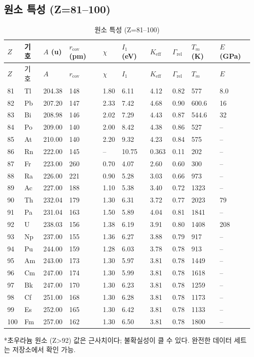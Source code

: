 \documentclass[12pt,a4paper]{article}
\newcommand{\Keff}{K_{\mathrm{eff}}}
\begin{document}
	\subsection*{원소 특성 (Z=81–100)}
	
	\begin{longtable}{p{0.6cm}p{1.2cm}p{1.2cm}p{1.2cm}p{1.2cm}p{1.2cm}p{1.5cm}p{1.2cm}p{1.2cm}p{1.2cm}}
		\caption{원소 특성 (Z=81–100)} \label{tab:elem-data-81to100} \\
		\toprule
		\(Z\) & 기호 & \(A\) (u) & \(r_{\text{cov}}\) (pm) & \(\chi\) & \(I_1\) (eV) & \(\Keff\) & \(\Gamma_{\text{rel}}\) & \(T_m\) (K) & \(E\) (GPa) \\
		\midrule
		\endfirsthead
		\toprule
		\(Z\) & 기호 & \(A\) & \(r_{\text{cov}}\) & \(\chi\) & \(I_1\) & \(\Keff\) & \(\Gamma_{\text{rel}}\) & \(T_m\) & \(E\) \\
		\midrule
		\endhead
		81 & Tl & 204.38 & 148 & 1.80 & 6.11 & 4.12 & 0.82 & 577 & 8.0 \\
		82 & Pb & 207.20 & 147 & 2.33 & 7.42 & 4.68 & 0.90 & 600.6 & 16 \\
		83 & Bi & 208.98 & 146 & 2.02 & 7.29 & 4.43 & 0.87 & 544.6 & 32 \\
		84 & Po & 209.00 & 140 & 2.00 & 8.42 & 4.38 & 0.86 & 527 & – \\
		85 & At & 210.00 & 140 & 2.20 & 9.32 & 4.23 & 0.84 & 575 & – \\
		86 & Rn & 222.00 & 145 & –    & 10.75 & 0.363 & 0.11 & 202 & – \\
		87 & Fr & 223.00 & 260 & 0.70 & 4.07 & 2.60 & 0.60 & 300 & – \\
		88 & Ra & 226.00 & 221 & 0.90 & 5.28 & 3.03 & 0.66 & 973 & – \\
		89 & Ac & 227.00 & 188 & 1.10 & 5.38 & 3.40 & 0.72 & 1323 & – \\
		90 & Th & 232.04 & 179 & 1.30 & 6.31 & 3.72 & 0.77 & 2023 & 79 \\
		91 & Pa & 231.04 & 163 & 1.50 & 5.89 & 4.04 & 0.81 & 1841 & – \\
		92 & U  & 238.03 & 156 & 1.38 & 6.19 & 3.91 & 0.80 & 1408 & 208 \\
		93 & Np & 237.00 & 155 & 1.36 & 6.27 & 3.88 & 0.79 & 917 & – \\
		94 & Pu & 244.00 & 159 & 1.28 & 6.03 & 3.78 & 0.78 & 913 & – \\
		95 & Am & 243.00 & 173 & 1.30 & 5.97 & 3.81 & 0.78 & 1449 & – \\
		96 & Cm & 247.00 & 174 & 1.30 & 5.99 & 3.81 & 0.78 & 1618 & – \\
		97 & Bk & 247.00 & 170 & 1.30 & 6.23 & 3.81 & 0.78 & 1259 & – \\
		98 & Cf & 251.00 & 168 & 1.30 & 6.28 & 3.81 & 0.78 & 1173 & – \\
		99 & Es & 252.00 & 165 & 1.30 & 6.42 & 3.81 & 0.78 & 1133 & – \\
		100& Fm & 257.00 & 162 & 1.30 & 6.50 & 3.81 & 0.78 & 1800 & – \\
		\bottomrule
	\end{longtable}
	*초우라늄 원소 (Z>92) 값은 근사치이다; 불확실성이 클 수 있다. 완전한 데이터 세트는 저장소에서 확인 가능.
	
\end{document}
